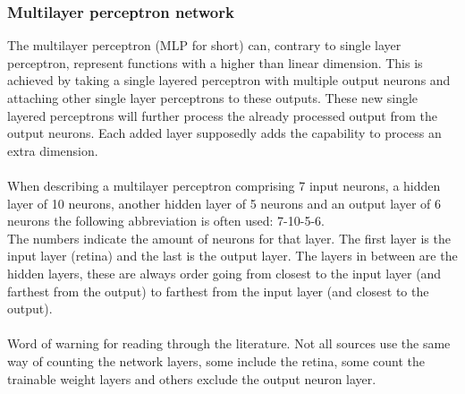\documentclass[pdftex,a4paper,12pt,twoside]{report}
\theoremstyle{plain} \newtheorem{theorem}{Theorem} \newtheorem{proposition}{Proposition} \newtheorem{lemma}{Lemma} \newtheorem*{corollary}{Corollary}
\theoremstyle{definition} \newtheorem{definition}{Definition} \newtheorem{conjecture}{Conjecture} \newtheorem*{example}{Example} \newtheorem{algorithm}{Algorithm}
\theoremstyle{remark} \newtheorem*{remark}{Remark} \newtheorem*{note}{Note} \newtheorem{case}{Case}
\begin{document}
\subsubsection{Multilayer perceptron network}
The multilayer perceptron (MLP for short) can, contrary to single layer perceptron, represent functions with a higher than linear dimension. This is achieved by taking a single layered perceptron with multiple output neurons and attaching other single layer perceptrons to these outputs. These new single layered perceptrons will further process the already processed output from the output neurons. Each added layer supposedly adds the capability to process an extra dimension.\\\\When describing a multilayer perceptron comprising 7 input neurons, a hidden layer of 10 neurons, another hidden layer of 5 neurons and an output layer of 6 neurons the following abbreviation is often used: 7-10-5-6.\\The numbers indicate the amount of neurons for that layer. The first layer is the input layer (retina) and the last is the output layer. The layers in between are the hidden layers, these are always order going from closest to the input layer (and farthest from the output) to farthest from the input layer (and closest to the output).\\\\Word of warning for reading through the literature. Not all sources use the same way of counting the network layers, some include the retina, some count the trainable weight layers and others exclude the output neuron layer.
\end{document}
